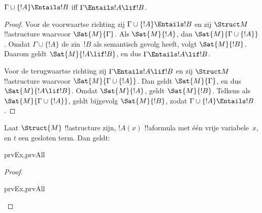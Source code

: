 \documentclass[openany]{memoir}
\begin{document}
\begin{thm}
$\Gamma \cup \{!A\} \Entails !B$ iff $\Gamma \Entails !A \lif !B$.
\end{thm}

\begin{proof}
Voor de voorwaartse richting zij
$\Gamma \cup \{ !A \} \Entails !B$ en zij $\Struct M$
!!a{structure} waarvoor $\Sat{M}{\Gamma}$. Als $\Sat{M}{!A}$, dan
$\Sat{M}{\Gamma \cup \{ !A \} }$. Omdat $\Gamma \cup \{ !A \}$ de
zin~$!B$ als semantisch gevolg heeft, volgt $\Sat{M}{!B}$. Daarom geldt
$\Sat{M}{!A \lif !B}$, en dus $\Gamma \Entails !A \lif !B$.

Voor de terugwaartse richting zij
$\Gamma \Entails !A \lif !B$ en zij $\Struct M$ !!a{structure}
waarvoor $\Sat{M}{\Gamma \cup \{ !A \}}$. Dan geldt
$\Sat{M}{\Gamma}$, en dus $\Sat{M}{!A \lif !B}$. Omdat
$\Sat{M}{!A}$, geldt $\Sat{M}{!B}$. Telkens als
$\Sat{M}{\Gamma \cup \{ !A \} }$, geldt bijgevolg $\Sat{M}{!B}$, zodat
$\Gamma \cup \{ !A \} \Entails !B$.
\end{proof}

\begin{prop}
  Laat $\Struct{M}$ !!a{structure} zijn, $!A(x)$ !!a{formula} met één
  vrije variabele~$x$, en $t$ een gesloten term. Dan geldt:
  \begin{tagenumerate}{prvEx,prvAll}
  \end{tagenumerate}
\end{prop}

\begin{proof}
  \begin{tagenumerate}{prvEx,prvAll}
  \end{tagenumerate}
\end{proof}
\end{document}
